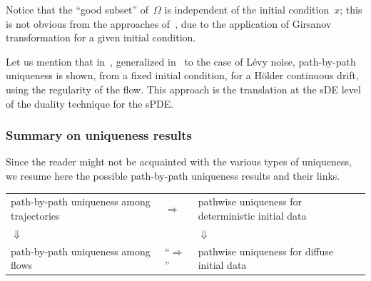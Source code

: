 \documentclass[a4paper,10pt]{article}
\newcommand\1{\mathbbm{1}}
\numberwithin{equation}{section}
\begin{document}
Notice that the ``good subset'' of~$\Omega$ is independent of the initial condition~$x$; this is not obvious from the approaches of~\cite{CATGUB13,DAVIE07}, due to the application of Girsanov transformation for a given initial condition.

Let us mention that in~\cite{SHA16}, generalized in~\cite{PRI18} to the case of L\'evy noise, path-by-path uniqueness is shown, from a fixed initial condition, for a H\"older continuous drift, using the regularity of the flow. This approach is the translation at the sDE level of the duality technique for the sPDE.

\subsubsection{Summary on uniqueness results}

Since the reader might not be acquainted with the various types of uniqueness, we resume here the possible path-by-path uniqueness results and their links.

\setlength{\extrarowheight}{5pt}
\begin{center}
\begin{tabular}{ >{\centering}m{4.5cm} >{\centering}m{2cm}  >{\centering}m{4.5cm} }
path-by-path uniqueness among trajectories & $\Rightarrow$ & pathwise uniqueness for deterministic initial data \tabularnewline
$\Downarrow$ &  \  &  $\Downarrow$ \tabularnewline
path-by-path uniqueness among flows & ``$\Rightarrow$'' & pathwise uniqueness for diffuse initial data
\end{tabular}
\end{center}
\end{document}
